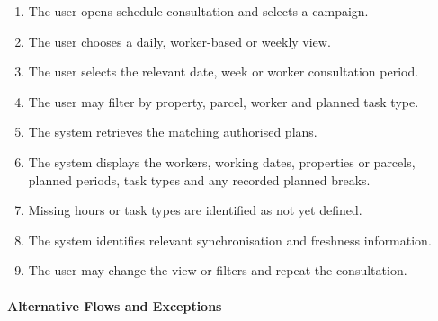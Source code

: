 \begin{enumerate}
    \item The user opens schedule consultation
    and selects a campaign.
    \item The user chooses a daily,
    worker-based or weekly view.
    \item The user selects the relevant date,
    week or worker consultation period.
    \item The user may filter by property,
    parcel, worker and planned task type.
    \item The system retrieves the matching
    authorised plans.
    \item The system displays the workers,
    working dates, properties or parcels,
    planned periods, task types
    and any recorded planned breaks.
    \item Missing hours or task types
    are identified as not yet defined.
    \item The system identifies relevant
    synchronisation and freshness information.
    \item The user may change the view
    or filters and repeat the consultation.
\end{enumerate}

\paragraph{Alternative Flows and Exceptions}

